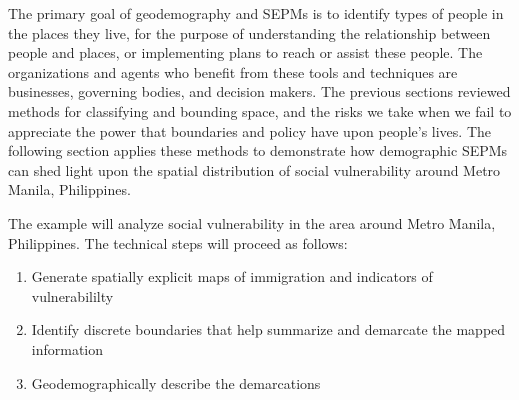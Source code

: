 \documentclass[draft]{article}
\begin{document}
The primary goal of geodemography and SEPMs is to identify types of people in the places they live, for the purpose of understanding the relationship between people and places, or implementing plans to reach or assist these people.  The organizations and agents who benefit from these tools and techniques are businesses, governing bodies, and decision makers.  %
The previous sections reviewed methods for classifying and bounding space, and the risks we take when we %
fail to appreciate the power that boundaries and policy have upon people's lives.  The following section applies these methods to demonstrate how demographic SEPMs can shed light upon the spatial distribution of social vulnerability around Metro Manila, Philippines.



The example will analyze social vulnerability in the area around Metro Manila, Philippines.  The technical steps will proceed as follows:

\begin{enumerate}
\item Generate spatially explicit maps of immigration and indicators of vulnerabililty
\item Identify discrete boundaries that help summarize and demarcate the mapped information
\item Geodemographically describe the demarcations
\end{enumerate}
\end{document}
